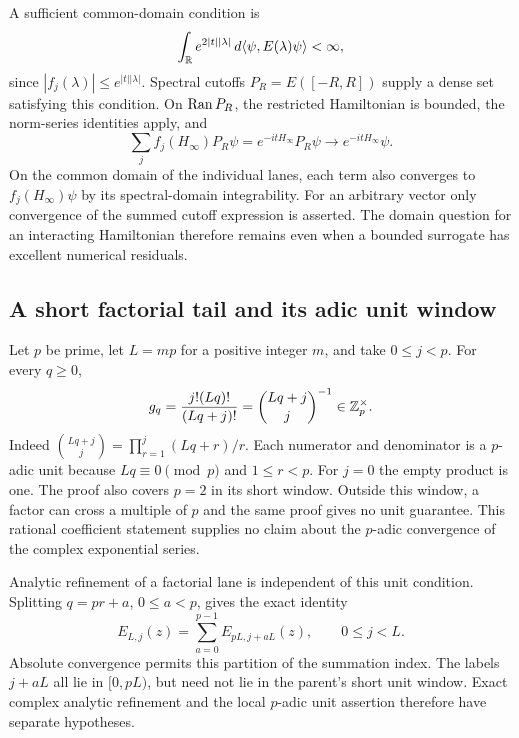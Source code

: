 A sufficient common-domain condition is
\begin{equation}
 \int_{\mathbb R} e^{2|t||\lambda|}
              \,d\langle\psi,E(\lambda)\psi\rangle<\infty,
 \label{a-spectral-exponential-domain}
\end{equation}
since $|f_j(\lambda)|\leq e^{|t||\lambda|}$. Spectral cutoffs
$P_R=E([-R,R])$ supply a dense set satisfying this condition. On
$\operatorname{Ran} P_R$, the restricted Hamiltonian is bounded, the norm-series
identities apply, and
\[
 \sum_jf_j(H_\infty)P_R\psi=e^{-itH_\infty}P_R\psi
      \longrightarrow e^{-itH_\infty}\psi.
\]
On the common domain of the individual lanes, each term also converges
to $f_j(H_\infty)\psi$ by its spectral-domain integrability.
For an arbitrary vector only convergence of the summed cutoff expression
is asserted. The domain question for an interacting Hamiltonian therefore
remains even when a bounded surrogate has excellent numerical residuals.

\subsection{A short factorial tail and its adic unit window}

Let $p$ be prime, let $L=mp$ for a positive integer $m$, and take
$0\leq j<p$. For every $q\geq0$,
\begin{equation}
 g_q=\frac{j!(Lq)!}{(Lq+j)!}
       =\binom{Lq+j}{j}^{-1}\in\mathbb Z_p^\times.
 \label{a-spectral-unit-window}
\end{equation}
Indeed
$\binom{Lq+j}{j}=\prod_{r=1}^j(Lq+r)/r$.
Each numerator and denominator is a $p$-adic unit because
$Lq\equiv0\pmod p$ and $1\leq r<p$. For $j=0$ the empty product
is one. The proof also covers $p=2$ in its short window. Outside this
window, a factor can cross a multiple of $p$ and the same proof gives
no unit guarantee. This rational coefficient statement supplies no
claim about the $p$-adic convergence of the complex exponential series.

Analytic refinement of a factorial lane is independent of this unit
condition. Splitting $q=pr+a$, $0\leq a<p$, gives the exact identity
\begin{equation}
 E_{L,j}(z)=\sum_{a=0}^{p-1}E_{pL,j+aL}(z),\qquad 0\leq j<L.
 \label{a-spectral-analytic-refinement}
\end{equation}
Absolute convergence permits this partition of the summation index.
The labels $j+aL$ all lie in $[0,pL)$, but need not lie in the
parent's short unit window. Exact complex analytic refinement and
the local $p$-adic unit assertion therefore have separate hypotheses.

